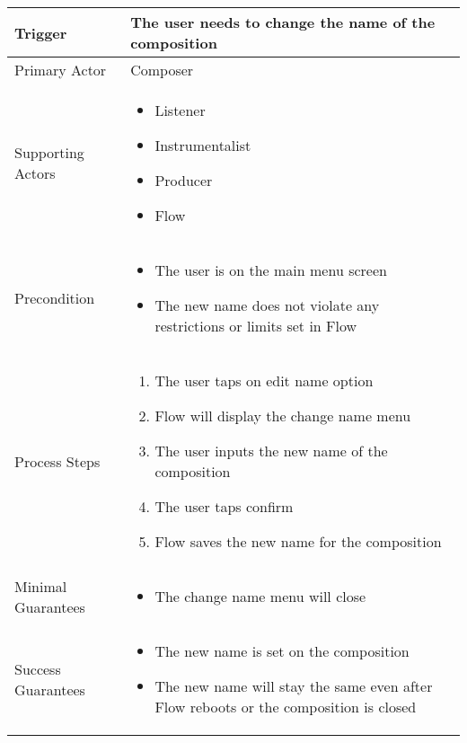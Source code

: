 \begin{longtable}{|X|X|}
\hline
Trigger & 
The user needs to change the name of the composition \\
\hline
Primary Actor & 
Composer \\
\hline
Supporting Actors & 
\begin{itemize}
\item Listener
\item Instrumentalist
\item Producer
\item Flow
\end{itemize} \\
\hline
Precondition & 
\begin{itemize}
\item The user is on the main menu screen
\item The new name does not violate any restrictions or limits set in Flow
\end{itemize} \\
\hline
Process Steps & 
\begin{enumerate}
\item The user taps on edit name option
\item Flow will display the change name menu
\item The user inputs the new name of the composition
\item The user taps confirm
\item Flow saves the new name for the composition
\end{enumerate} \\
\hline
Minimal Guarantees & 
\begin{itemize}
  \item The change name menu will close
\end{itemize}\\
\hline
Success Guarantees & 
\begin{itemize}
  \item The new name is set on the composition
  \item The new name will stay the same even after Flow reboots or the composition is closed
\end{itemize} \\
\hline
\end{longtable}